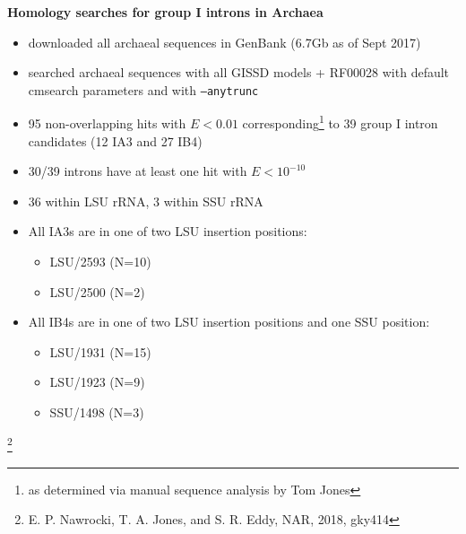\documentclass[landscape]{slides}
\begin{document}
\begin{slide}
\begin{center}
\textbf{Homology searches for group I introns in Archaea}
\end{center}
%
\small
\begin{itemize}
\item downloaded all archaeal sequences in GenBank (6.7Gb as of Sept
  2017)
\item searched archaeal sequences with all GISSD models + RF00028 with
  default cmsearch parameters and with \texttt{--anytrunc}
\item 95 non-overlapping hits with $E < 0.01$
  corresponding\footnote{as determined via manual sequence analysis by Tom Jones} to 39
  group I intron candidates (12 IA3 and 27 IB4)
\item 30/39 introns have at least one hit with $E < 10^{-10}$ 
\item 36 within LSU rRNA, 3 within SSU rRNA
\item All IA3s are in one of two LSU insertion positions:
  \begin{itemize}
  \item LSU/2593 (N=10)
  \item LSU/2500 (N=2)
  \end{itemize}
\item All IB4s are in one of two LSU insertion positions and one SSU
  position:
  \begin{itemize}
  \item LSU/1931 (N=15)
  \item LSU/1923 (N=9)
  \item SSU/1498 (N=3)
  \end{itemize}  
\end{itemize}  

\vfill
\end{slide}
\begin{slide}

\footnote{
E. P. Nawrocki, T. A. Jones, and S. R. Eddy, NAR, 2018, gky414}

\vfill
\end{slide}
\end{document}
